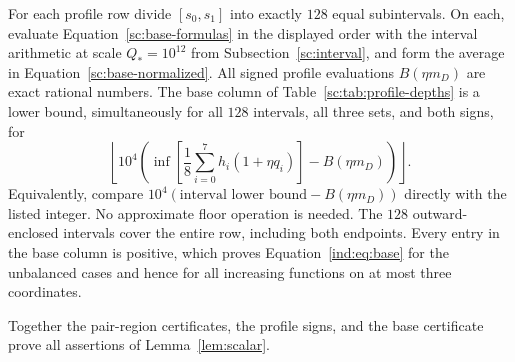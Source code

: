 For each profile row divide $[s_0,s_1]$ into exactly $128$ equal
subintervals.  On each, evaluate Equation~\eqref{sc:base-formulas} in the displayed
order with the interval arithmetic at scale $Q_*=10^{12}$ from
Subsection~\ref{sc:interval}, and form the average in
Equation~\eqref{sc:base-normalized}.  All signed profile evaluations
$B(\eta m_D)$ are exact rational numbers.  The base column of
Table~\ref{sc:tab:profile-depths} is a lower bound, simultaneously for
all $128$ intervals, all three sets, and both signs, for
\begin{equation}\label{sc:base-column}
 \left\lfloor10^4\left(
 \inf\left[\frac18\sum_{i=0}^7h_i(1+\eta q_i)\right]
                              -B(\eta m_D)\right)\right\rfloor.
\end{equation}
Equivalently, compare $10^4(\text{interval lower bound}-B(\eta m_D))$
directly with the listed integer.  No approximate floor operation is
needed.  The $128$ outward-enclosed intervals cover the entire row,
including both endpoints.  Every entry in the base column is positive,
which proves Equation~\eqref{ind:eq:base} for the unbalanced cases and hence for
all increasing functions on at most three coordinates.

Together the pair-region certificates, the profile signs, and the base
certificate prove all assertions of Lemma~\ref{lem:scalar}.
